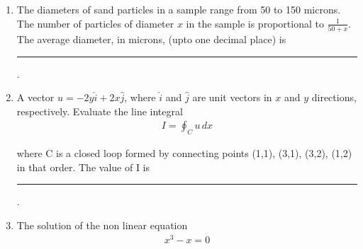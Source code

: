 \documentclass[journal,12pt,onecolumn]{IEEEtran}
\theoremstyle{remark}
\begin{document}
\begin{enumerate}
\hfill{}
\begin{multicols}{2}
    \begin{enumerate}[label =\Roman*]
        \item Single Superphosphate
         \item Triple Superphosphate
          \item Diammonium Phosphate
           \item Caustic soda
    \end{enumerate}
\columnbreak
    \begin{enumerate}[label = \Alph*]
        \item Rock phosphate + Sulphuric Acid + Ammonia
         \item Brine
          \item Rock phosphate + Sulphuric Acid
           \item Rock phosphate + Phosphoric Acid
    \end{enumerate}
\end{multicols}

\begin{enumerate}
    \item I-Q, II-R, III-S, IV-P
     \item I-S, II-P, III-Q, IV-R
      \item I-R, II-S, III-P, IV-Q
       \item I-S, II-R, III-P, IV-Q
\end{enumerate}    

    \item The diameters of sand particles in a sample range from 50 to 150 microns. The number of particles of diameter $x$ in the sample is proportional to $\frac{1}{50+x}$. The average diameter, in microns, (upto one decimal place) is \rule{40pt}{0.1mm}.

\hfill{}
    \item A vector $u = -2y\hat{i} + 2x\hat{j}$, where $\hat{i}$ and $\hat{j}$ are unit vectors in $x$ and $y$ directions, respectively. Evaluate the line integral
    \begin{align*}
        I = \oint_{C} u \, dx
    \end{align*}

    where C is a closed loop formed by connecting points (1,1), (3,1), (3,2), (1,2) in that order. The value of I is \rule{40pt}{0.1mm}.

\hfill{}
    \item The solution of the non linear equation 
    \begin{align*}
        x^3 - x = 0
    \end{align*}


\end{enumerate}
\end{document}
